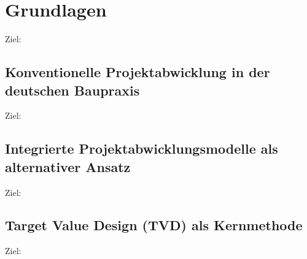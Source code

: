 \chapter{Grundlagen}
\label{ch:grundlagen}
Ziel: 

\section{Konventionelle Projektabwicklung in der deutschen Baupraxis}
\label{sec: 2.1}
Ziel:

\section{Integrierte Projektabwicklungsmodelle als alternativer Ansatz}
\label{sec: 2.2}
Ziel:

\section{Target Value Design (TVD) als Kernmethode}
\label{sec: 2.3}
Ziel: